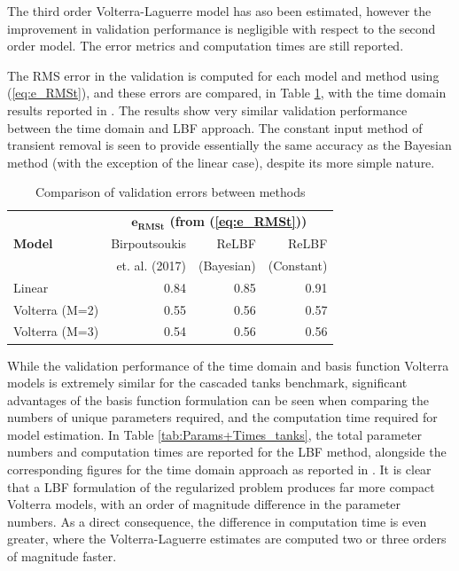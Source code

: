 The third order Volterra-Laguerre model has aso been estimated, however the improvement in validation performance is negligible with respect to the second order model. The error metrics and computation times are still reported.

The RMS error in the validation is computed for each model and method using (\ref{eq:e_RMSt}), and these errors are compared, in Table \ref{tab:eRMS_tanks}, with the time domain results reported in \cite{Birpoutsoukis2017b}. The results show very similar validation performance between the time domain and LBF approach. The constant input method of transient removal is seen to provide essentially the same accuracy as the Bayesian method (with the exception of the linear case), despite its more simple nature. 

\renewcommand{\arraystretch}{1.3}
\begin{table}[h]
\centering
\caption{Comparison of validation errors between methods}
\label{tab:eRMS_tanks}
\begin{tabular}{|l||r|r|r|}
\hline
                & \multicolumn{3}{c|}{\textbf{$\mathbf{e_{RMSt}}$ (from (\ref{eq:e_RMSt}))}} \\ \cline{2-4} 
\textbf{Model} & Birpoutsoukis           & ReLBF            & ReLBF                \\ 
		&  et. al. (2017) \cite{Birpoutsoukis2017b}          & (Bayesian)           & (Constant)                \\ \hline 
Linear         & 0.84              & 0.85             & 0.91                            \\ \hline
Volterra (M=2)         & 0.55               & 0.56             & 0.57                             \\ \hline
Volterra (M=3)           & 0.54              & 0.56             & 0.56                             \\ \hline
\end{tabular}
\end{table}

While the validation performance of the time domain and basis function Volterra models is extremely similar for the cascaded tanks benchmark, significant advantages of the basis function formulation can be seen when comparing the numbers of unique parameters required, and the computation time required for model estimation. In Table \ref{tab:Params+Times_tanks}, the total parameter numbers and computation times are reported for the LBF method, alongside the corresponding figures for the time domain approach as reported in \cite{Birpoutsoukis2017c}. It is clear that a LBF formulation of the regularized problem produces far more compact Volterra models, with an order of magnitude difference in the parameter numbers. As a direct consequence, the difference in computation time is even greater, where the Volterra-Laguerre estimates are computed two or three orders of magnitude faster.

